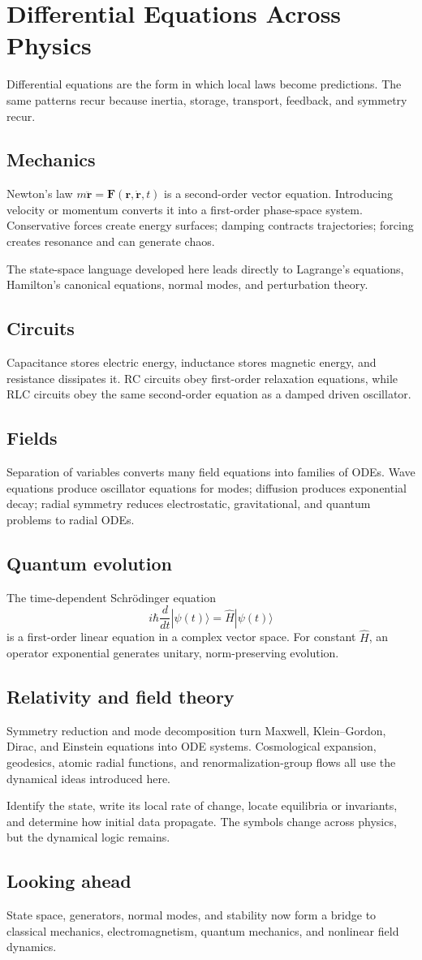 \section{Differential Equations Across Physics}
\label{sec:ch4-physics-applications}
Differential equations are the form in which local laws become predictions. The same patterns recur because inertia, storage, transport, feedback, and symmetry recur.
\subsection{Mechanics}
Newton's law $m\ddot{\mathbf r}=\mathbf F(\mathbf r,\dot{\mathbf r},t)$ is a second-order vector equation. Introducing velocity or momentum converts it into a first-order phase-space system. Conservative forces create energy surfaces; damping contracts trajectories; forcing creates resonance and can generate chaos.
\begin{physical}
The state-space language developed here leads directly to Lagrange's equations, Hamilton's canonical equations, normal modes, and perturbation theory.
\end{physical}
\subsection{Circuits}
Capacitance stores electric energy, inductance stores magnetic energy, and resistance dissipates it. RC circuits obey first-order relaxation equations, while RLC circuits obey the same second-order equation as a damped driven oscillator.
\subsection{Fields}
Separation of variables converts many field equations into families of ODEs. Wave equations produce oscillator equations for modes; diffusion produces exponential decay; radial symmetry reduces electrostatic, gravitational, and quantum problems to radial ODEs.
\subsection{Quantum evolution}
The time-dependent Schrödinger equation
\[i\hbar\frac{d}{dt}|\psi(t)\rangle=\hat H|\psi(t)\rangle\]
is a first-order linear equation in a complex vector space. For constant $\hat H$, an operator exponential generates unitary, norm-preserving evolution.
\subsection{Relativity and field theory}
Symmetry reduction and mode decomposition turn Maxwell, Klein--Gordon, Dirac, and Einstein equations into ODE systems. Cosmological expansion, geodesics, atomic radial functions, and renormalization-group flows all use the dynamical ideas introduced here.
\begin{keyidea}
Identify the state, write its local rate of change, locate equilibria or invariants, and determine how initial data propagate. The symbols change across physics, but the dynamical logic remains.
\end{keyidea}
\subsection{Looking ahead}
State space, generators, normal modes, and stability now form a bridge to classical mechanics, electromagnetism, quantum mechanics, and nonlinear field dynamics.
